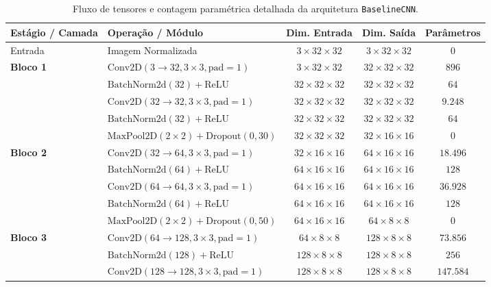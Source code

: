 \documentclass[runningheads]{llncs}
\begin{document}
\begin{table}[H]
\centering
\caption{Fluxo de tensores e contagem param\'{e}trica detalhada da arquitetura \texttt{BaselineCNN}.}
\label{tab:camadas_baseline}
\setlength{\tabcolsep}{6pt}
\small
\begin{tabular}{llccc}
\toprule
\textbf{Est\'{a}gio / Camada} & \textbf{Opera\c{c}\~{a}o / M\'{o}dulo} & \textbf{Dim. Entrada} & \textbf{Dim. Sa\'{i}da} & \textbf{Par\^{a}metros} \\
\midrule
Entrada & Imagem Normalizada & $3 \times 32 \times 32$ & $3 \times 32 \times 32$ & $0$ \\
\midrule
\textbf{Bloco 1} & $\text{Conv2D}(3 \to 32, 3 \times 3, \text{pad}=1)$ & $3 \times 32 \times 32$ & $32 \times 32 \times 32$ & $896$ \\
& $\text{BatchNorm2d}(32) + \text{ReLU}$ & $32 \times 32 \times 32$ & $32 \times 32 \times 32$ & $64$ \\
& $\text{Conv2D}(32 \to 32, 3 \times 3, \text{pad}=1)$ & $32 \times 32 \times 32$ & $32 \times 32 \times 32$ & $9.248$ \\
& $\text{BatchNorm2d}(32) + \text{ReLU}$ & $32 \times 32 \times 32$ & $32 \times 32 \times 32$ & $64$ \\
& $\text{MaxPool2D}(2 \times 2) + \text{Dropout}(0{,}30)$ & $32 \times 32 \times 32$ & $32 \times 16 \times 16$ & $0$ \\
\midrule
\textbf{Bloco 2} & $\text{Conv2D}(32 \to 64, 3 \times 3, \text{pad}=1)$ & $32 \times 16 \times 16$ & $64 \times 16 \times 16$ & $18.496$ \\
& $\text{BatchNorm2d}(64) + \text{ReLU}$ & $64 \times 16 \times 16$ & $64 \times 16 \times 16$ & $128$ \\
& $\text{Conv2D}(64 \to 64, 3 \times 3, \text{pad}=1)$ & $64 \times 16 \times 16$ & $64 \times 16 \times 16$ & $36.928$ \\
& $\text{BatchNorm2d}(64) + \text{ReLU}$ & $64 \times 16 \times 16$ & $64 \times 16 \times 16$ & $128$ \\
& $\text{MaxPool2D}(2 \times 2) + \text{Dropout}(0{,}50)$ & $64 \times 16 \times 16$ & $64 \times 8 \times 8$ & $0$ \\
\midrule
\textbf{Bloco 3} & $\text{Conv2D}(64 \to 128, 3 \times 3, \text{pad}=1)$ & $64 \times 8 \times 8$ & $128 \times 8 \times 8$ & $73.856$ \\
& $\text{BatchNorm2d}(128) + \text{ReLU}$ & $128 \times 8 \times 8$ & $128 \times 8 \times 8$ & $256$ \\
& $\text{Conv2D}(128 \to 128, 3 \times 3, \text{pad}=1)$ & $128 \times 8 \times 8$ & $128 \times 8 \times 8$ & $147.584$ \\

\end{tabular}
\end{table}
\end{document}
